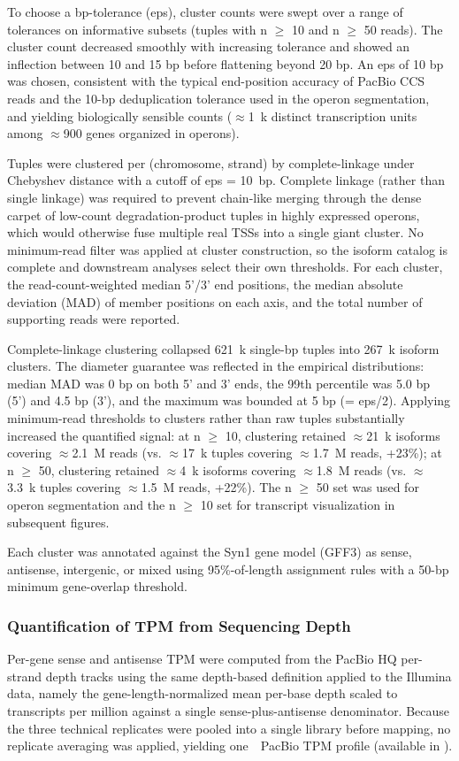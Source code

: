 To choose a bp-tolerance (eps), cluster counts were swept over a range of tolerances on informative subsets (tuples with n $\geq$ 10 and n $\geq$ 50 reads).
The cluster count decreased smoothly with increasing tolerance and showed an inflection between 10 and 15 bp before flattening beyond 20 bp.
An eps of 10 bp was chosen, consistent with the typical end-position accuracy of PacBio CCS reads and the 10-bp deduplication tolerance used in the operon segmentation, and yielding biologically sensible counts ($\approx$1~k distinct transcription units among $\approx$900 genes organized in operons).

Tuples were clustered per (chromosome, strand) by complete-linkage under Chebyshev distance with a cutoff of eps = 10~bp.
Complete linkage (rather than single linkage) was required to prevent chain-like merging through the dense carpet of low-count degradation-product tuples in highly expressed operons, which would otherwise fuse multiple real TSSs into a single giant cluster.
No minimum-read filter was applied at cluster construction, so the isoform catalog is complete and downstream analyses select their own thresholds.
For each cluster, the read-count-weighted median 5'/3' end positions, the median absolute deviation (MAD) of member positions on each axis, and the total number of supporting reads were reported.

Complete-linkage clustering collapsed 621~k single-bp tuples into 267~k isoform clusters.
The diameter guarantee was reflected in the empirical distributions: median MAD was 0 bp on both 5' and 3' ends, the 99th percentile was 5.0 bp (5') and 4.5 bp (3'), and the maximum was bounded at 5 bp (= eps/2).
Applying minimum-read thresholds to clusters rather than raw tuples substantially increased the quantified signal: at n $\geq$ 10, clustering retained $\approx$21~k isoforms covering $\approx$2.1~M reads (vs. $\approx$17~k tuples covering $\approx$1.7~M reads, +23\%); at n $\geq$ 50, clustering retained $\approx$4~k isoforms covering $\approx$1.8~M reads (vs. $\approx$3.3~k tuples covering $\approx$1.5~M reads, +22\%).
The n $\geq$ 50 set was used for operon segmentation and the n $\geq$ 10 set for transcript visualization in subsequent figures.

Each cluster was annotated against the Syn1 gene model (GFF3) as sense, antisense, intergenic, or mixed using 95\%-of-length assignment rules with a 50-bp minimum gene-overlap threshold.

\subsubsection{Quantification of TPM from Sequencing Depth}

Per-gene sense and antisense TPM were computed from the PacBio HQ per-strand depth tracks using the same depth-based definition applied to the Illumina data, namely the gene-length-normalized mean per-base depth scaled to transcripts per million against a single sense-plus-antisense denominator.
Because the three technical replicates were pooled into a single library before mapping, no replicate averaging was applied, yielding one~\syn~PacBio TPM profile (available in \sdomics).